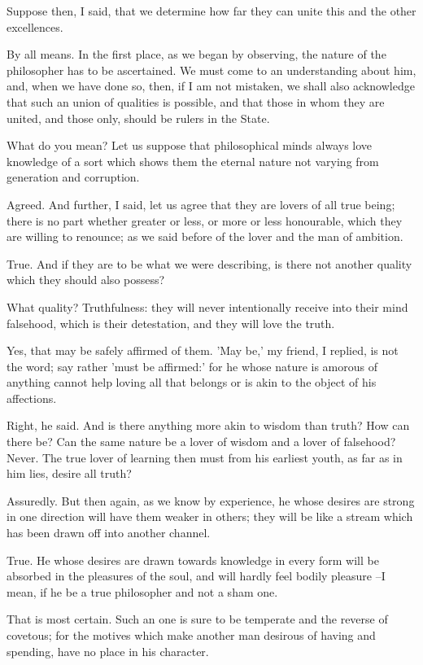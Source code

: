 Suppose then, I said, that we determine how far they can unite this and the other excellences.

By all means.
In the first place, as we began by observing, the nature of the philosopher has to be ascertained. We must come to an understanding about him, and, when we have done so, then, if I am not mistaken, we shall also acknowledge that such an union of qualities is possible, and that those in whom they are united, and those only, should be rulers in the State.

What do you mean?
Let us suppose that philosophical minds always love knowledge of a sort which shows them the eternal nature not varying from generation and corruption.

Agreed.
And further, I said, let us agree that they are lovers of all true being; there is no part whether greater or less, or more or less honourable, which they are willing to renounce; as we said before of the lover and the man of ambition.

True.
And if they are to be what we were describing, is there not another quality which they should also possess?

What quality?
Truthfulness: they will never intentionally receive into their mind falsehood, which is their detestation, and they will love the truth.

Yes, that may be safely affirmed of them.
'May be,' my friend, I replied, is not the word; say rather 'must be affirmed:' for he whose nature is amorous of anything cannot help loving all that belongs or is akin to the object of his affections.

Right, he said.
And is there anything more akin to wisdom than truth?
How can there be?
Can the same nature be a lover of wisdom and a lover of falsehood?
Never.
The true lover of learning then must from his earliest youth, as far as in him lies, desire all truth?

Assuredly.
But then again, as we know by experience, he whose desires are strong in one direction will have them weaker in others; they will be like a stream which has been drawn off into another channel.

True.
He whose desires are drawn towards knowledge in every form will be absorbed in the pleasures of the soul, and will hardly feel bodily pleasure --I mean, if he be a true philosopher and not a sham one.

That is most certain.
Such an one is sure to be temperate and the reverse of covetous; for the motives which make another man desirous of having and spending, have no place in his character.


